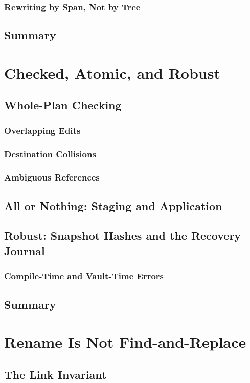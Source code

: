 \documentclass[nohyper,nobib]{tufte-book}
\begin{document}
\subsection{Rewriting by Span, Not by Tree}
\section{Summary}

\chapter{Checked, Atomic, and Robust}
\section{Whole-Plan Checking}
\subsection{Overlapping Edits}
\subsection{Destination Collisions}
\subsection{Ambiguous References}
\section{All or Nothing: Staging and Application}
\section{Robust: Snapshot Hashes and the Recovery Journal}
\subsection{Compile-Time and Vault-Time Errors}
\section{Summary}

\chapter{Rename Is Not Find-and-Replace}
\section{The Link Invariant}
\end{document}
